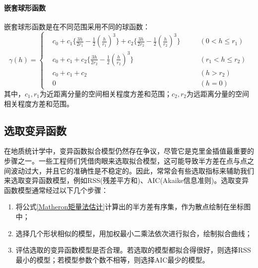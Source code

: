 \paragraph{嵌套球形函数}
嵌套球形函数是在不同范围采用不同的球函数：
\begin{equation}
    \gamma \left( h \right) =
    \left\{
    \begin{aligned}
         & c_{0} + c_{1} \{ \frac{3h}{2r_{1}} - \frac{1}{2}\left( \frac{h}{r_{1}} \right)^{3} \} + c_{2} \{ \frac{3h}{2r_{2}} - \frac{1}{2}\left( \frac{h}{r_{2}} \right)^{3} \} \qquad & \left( 0 < h \leq r_{1} \right)     \\
         & c_{0} + c_{1} + c_{2} \{ \frac{3h}{2r_{2}} - \frac{1}{2}\left( \frac{h}{r_{2}} \right)^{3} \}                                                                                & \left( r_{1} < h \leq r_{2} \right) \\
         & c_{0} + c_{1} + c_{2}                                                                                                                                                        & \left( h > r_{2} \right)            \\
         & 0                                                                                                                                                                            & \left( h = 0 \right)
    \end{aligned}
    \right.
\end{equation}
其中，$ c_{1},r_{1} $为近距离分量的空间相关程度方差和范围；$ c_{2},r_{2} $为远距离分量的空间相关程度方差和范围。

\subsection{选取变异函数}
在地质统计学中，变异函数拟合模型仍然存在争议，尽管它是克里金插值最重要的步骤之一。一些工程师们凭借肉眼来选取拟合模型，这可能导致半方差在点与点之间波动过大，并且它的准确性是不稳定的。因此，常常会有些选取指标来辅助我们来选取变异函数模型，例如RSS(残差平方和)、AIC(Akaike信息准则)。选取变异函数模型通常经过以下几个步骤：
\begin{enumerate}
    \item 将公式\ref{Matheron矩量法估计}计算出的半方差有序集，作为散点绘制在坐标图中；
    \item 选择几个形状相似的模型，用加权最小二乘法依次进行拟合，绘制拟合曲线；
    \item 评估选取的变异函数模型是否合理。若选取的模型都拟合得很好，则选择RSS最小的模型；若模型参数个数不相等，则选择AIC最少的模型。
\end{enumerate}

